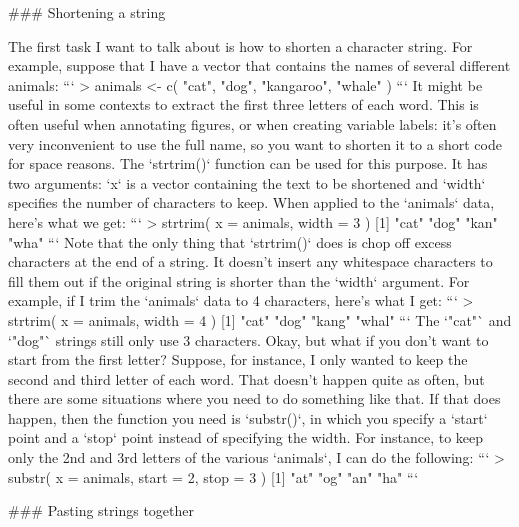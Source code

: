 ### Shortening a string

The first task I want to talk about is how to shorten a character string. For example, suppose that I have a vector that contains the names of several different animals:
```
> animals <- c( "cat", "dog", "kangaroo", "whale" )
```
It might be useful in some contexts to extract the first three letters of each word. This is often useful when annotating figures, or when creating variable labels: it's often very inconvenient to use the full name, so you want to shorten it to a short code for space reasons. The `strtrim()` function can be used for this purpose. It has two arguments: `x` is a vector containing the text to be shortened and `width` specifies the number of characters to keep. When applied to the `animals` data, here's what we get:
```
> strtrim( x = animals, width = 3 )
[1] "cat" "dog" "kan" "wha"
```
Note that the only thing that `strtrim()` does is chop off excess characters at the end of a string. It doesn't insert any whitespace characters to fill them out if the original string is shorter than the `width` argument. For example, if I trim the `animals` data to 4 characters, here's what I get:
```
> strtrim( x = animals, width = 4 )
[1] "cat"  "dog"  "kang" "whal"
```
The `"cat"` and `"dog"` strings still only use 3 characters. Okay, but what if you don't want to start from the first letter? Suppose, for instance, I only wanted to keep the second and third letter of each word. That doesn't happen quite as often, but there are some situations where you need to do something like that. If that does happen, then the function you need is `substr()`, in which you specify a `start` point and a `stop` point instead of specifying the width. For instance, to keep only the 2nd and 3rd letters of the various `animals`, I can do the following:
```
> substr( x = animals, start = 2, stop = 3 )
[1] "at" "og" "an" "ha"
```


### Pasting strings together


